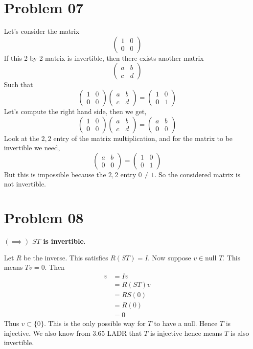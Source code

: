 \documentclass[letter]{article}
\begin{document}
\section*{Problem 07} 
Let's consider the matrix 
\[
	\begin{pmatrix} 1 & 0 \\ 0 & 0  \end{pmatrix} 
\] 
If this  2-by-2 matrix is invertible, then there exists another matrix 
\[
	\begin{pmatrix} a & b \\ c & d \end{pmatrix} 
\] Such that 
\[
	\begin{pmatrix} 1 & 0 \\ 0 & 0  \end{pmatrix} 
	\begin{pmatrix} a & b \\ c & d \end{pmatrix}  
	= 
	\begin{pmatrix} 1 & 0 \\ 0 & 1  \end{pmatrix} 
\]
Let's compute the right hand side, then we get, 
\[
	\begin{pmatrix} 1 & 0 \\ 0 & 0  \end{pmatrix} 
	\begin{pmatrix} a & b \\ c & d \end{pmatrix}  
= 
	\begin{pmatrix} a & b \\ 0 & 0 \end{pmatrix} 
\]
Look at the $2,2$ entry of the matrix multiplication, and for the matrix to be invertible we need, 
\[
	\begin{pmatrix} a & b \\ 0 & 0 \end{pmatrix} 
	= \begin{pmatrix} 1 & 0 \\ 0 & 1  \end{pmatrix} 
\] 
But this is impossible because the $2,2$ entry $0 \neq 1$. So the considered matrix is not invertible. 

\section*{Problem 08}
\textbf{$(\implies)$ $ST$ is invertible. }

Let $R$ be the inverse. This satisfies $R (ST) = I$. Now suppose $v \in \text{null }T$. This means $Tv = 0$. Then 
\begin{align*}
	v &= Iv \\
	&= R(ST) v \\
	&= RS(0) \\ &= R(0)\\ 
	&= 0 
\end{align*}
Thus $v \subset \{0\} $. This is the only possible way for $T$ to have a null. Hence $ T$ is injective. We also know from 3.65 LADR that $T$ is injective hence means $T$ is also invertible. 
\end{document}
